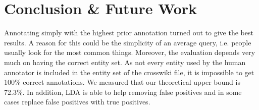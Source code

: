 \documentclass[a4paper,10pt,twocolumn]{article}
\begin{document}
\section{Conclusion \& Future Work}
Annotating simply with the highest prior annotation turned out to give the best results. A reason for this could be the simplicity of an average query, i.e. people usually look for the most common things. Moreover, the evaluation depends very much on having the correct entity set. As not every entity used by the human annotator is included in the entity set of the crosswiki file, it is impossible to get 100\% correct annotations. We measured that our theoretical upper bound is 72.3\%. In addition, LDA is able to help removing false positives and in some cases replace false positives with true positives.
\end{document}
